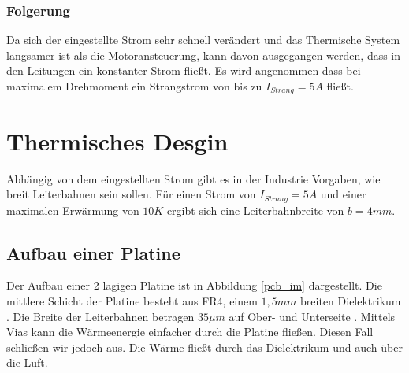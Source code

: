 \documentclass[10pt,a4paper,oneside,abstracton]{scrartcl}
\begin{document}
\begin{multicols}{2}
\subsubsection{Folgerung}
Da sich der eingestellte Strom sehr schnell verändert und das Thermische System langsamer ist als die Motoransteuerung, 
kann davon ausgegangen werden, dass in den Leitungen ein konstanter Strom fließt. 
Es wird angenommen dass bei maximalem Drehmoment ein Strangstrom von bis zu $I_{Strang} = 5 A $  fließt. 

\section{Thermisches Desgin}
Abhängig von dem eingestellten Strom gibt es in der Industrie Vorgaben, 
wie breit Leiterbahnen sein sollen. \newline
Für einen Strom von $I_{Strang} = 5 A $ und einer maximalen Erwärmung von $10 K$ ergibt sich eine
Leiterbahnbreite von $b = 4 mm $.


\subsection*{Aufbau einer Platine}
Der Aufbau einer 2 lagigen Platine ist in Abbildung \ref*{pcb_im} dargestellt. 
\newline
Die mittlere Schicht der Platine besteht aus FR4, einem $ 1,5mm $ breiten Dielektrikum \cite{PCB_Querschnitt}. 
\newline
Die Breite der Leiterbahnen betragen $ 35 \mu m$ auf Ober- und Unterseite \cite{aisler}.
Mittels Vias kann die Wärmeenergie einfacher durch die Platine fließen. Diesen Fall schließen wir jedoch aus. 
Die Wärme fließt durch das Dielektrikum und auch über die Luft. 



\end{multicols}
\end{document}

